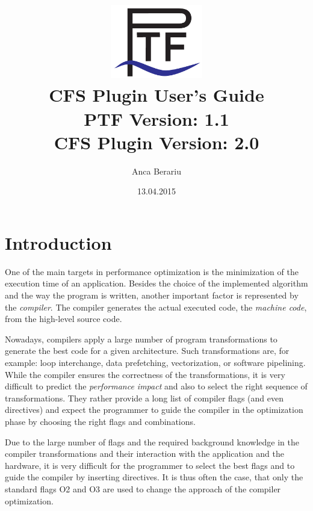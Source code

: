 \documentclass[11pt,a4paper, oneside]{book} %
\begin{document}
\title{\includegraphics[width=4cm]{../images/Ptf_LogoBlau}\\ \vspace{1cm}
\textsf{\bf \huge CFS Plugin User's Guide }\\
       \normalsize PTF Version: 1.1\\
       CFS Plugin Version: 2.0}
\author{Anca Berariu}
\date{13.04.2015}

\maketitle
\tableofcontents

\chapter{Introduction}

One of the main targets in performance optimization is the minimization of the execution time of an application. Besides the choice of the implemented algorithm and the way the program is written, another important factor is represented by the \textit{compiler}. The compiler generates the actual executed code, the \textit{machine code}, from the high-level source code.

Nowadays, compilers apply a large number of program transformations to generate the best code for a given architecture. Such transformations are, for example: loop interchange, data prefetching, vectorization, or software pipelining. While the compiler ensures the correctness of the transformations, it is very difficult to predict the \textit{performance impact} and also to select the right sequence of transformations. They rather provide a long list of compiler flags (and even directives) and expect the programmer to guide the compiler in the optimization phase by choosing the right flags and combinations.

Due to the large number of flags and the required background knowledge in the compiler transformations and their interaction with the application and the hardware, it is very difficult for the programmer to select the best flags and to guide the compiler by inserting directives. It is thus often the case, that only the standard flags O2 and O3 are used to change the approach of the compiler optimization.
\end{document}
